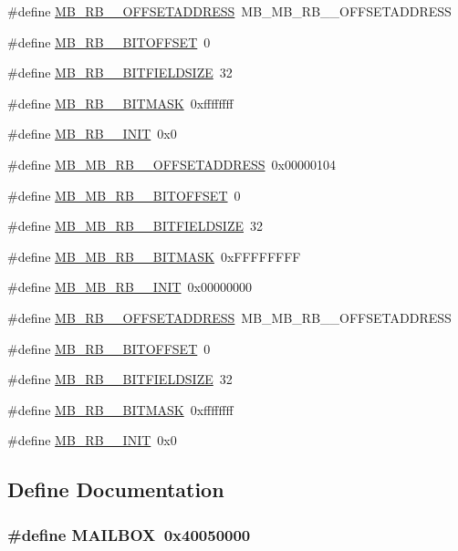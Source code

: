 \begin{DoxyCompactItemize}
\item 
\#define \hyperlink{a00562_a396b6195feb415bfded154c270303360}{MB\_\-RB\_\_\-OFFSETADDRESS}~MB\_\-MB\_\-RB\_\_\-OFFSETADDRESS
\item 
\#define \hyperlink{a00562_ad75f113ddc424394f314308f55c3155c}{MB\_\-RB\_\_\-BITOFFSET}~0
\item 
\#define \hyperlink{a00562_a68658cde3c61de8b0340d054108e7c51}{MB\_\-RB\_\_\-BITFIELDSIZE}~32
\item 
\#define \hyperlink{a00562_a44f62ac8267c1a5ab13b97986a797dc3}{MB\_\-RB\_\_\-BITMASK}~0xffffffff
\item 
\#define \hyperlink{a00562_a6e21363b1f2c1b62d022eb1d94bce0aa}{MB\_\-RB\_\_\-INIT}~0x0
\item 
\#define \hyperlink{a00562_add91429f73c1e41ff4164809ce5e60f7}{MB\_\-MB\_\-RB\_\_\-OFFSETADDRESS}~0x00000104
\item 
\#define \hyperlink{a00562_a4e0a722653052b35a9c3cdd0a0bf3277}{MB\_\-MB\_\-RB\_\_\-BITOFFSET}~0
\item 
\#define \hyperlink{a00562_a72ee8238201c63ab9740fab84eb4d9d8}{MB\_\-MB\_\-RB\_\_\-BITFIELDSIZE}~32
\item 
\#define \hyperlink{a00562_a8f1c60fd420e33387a849cd55c73dcfa}{MB\_\-MB\_\-RB\_\_\-BITMASK}~0xFFFFFFFF
\item 
\#define \hyperlink{a00562_a888bdffa0bf31e92ec50e0bfb8da85bb}{MB\_\-MB\_\-RB\_\_\-INIT}~0x00000000
\item 
\#define \hyperlink{a00562_a668bb1f277da1149fadaac1b3ec93703}{MB\_\-RB\_\_\-OFFSETADDRESS}~MB\_\-MB\_\-RB\_\_\-OFFSETADDRESS
\item 
\#define \hyperlink{a00562_a42b3ac26f820d3b6228166d830a65b80}{MB\_\-RB\_\_\-BITOFFSET}~0
\item 
\#define \hyperlink{a00562_adb96bbdd834208299efc18898b085190}{MB\_\-RB\_\_\-BITFIELDSIZE}~32
\item 
\#define \hyperlink{a00562_a7e415b912d8d643788caf2a183d3737b}{MB\_\-RB\_\_\-BITMASK}~0xffffffff
\item 
\#define \hyperlink{a00562_afa00a44690c1446d4527094ba91c88e9}{MB\_\-RB\_\_\-INIT}~0x0
\end{DoxyCompactItemize}


\subsection{Define Documentation}
\hypertarget{a00562_aec191881c194bbd41398484be819f3f2}{
\subsubsection[{MAILBOX}]{\setlength{\rightskip}{0pt plus 5cm}\#define MAILBOX~0x40050000}}
\label{a00562_aec191881c194bbd41398484be819f3f2}


